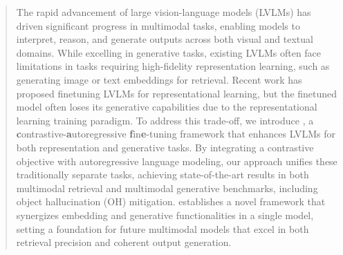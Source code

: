 \begin{abstract}
The rapid advancement of large vision-language models (LVLMs) has driven significant progress in multimodal tasks, enabling models to interpret, reason, and generate outputs across both visual and textual domains. 
%
While excelling in generative tasks, existing LVLMs often face limitations in tasks requiring high-fidelity representation learning, such as generating image or text embeddings for retrieval. 
%
Recent work has proposed finetuning LVLMs for representational learning, but the finetuned model often loses its generative capabilities due to the representational learning training paradigm.
%
To address this trade-off, we introduce \textbf{\algname}, a \textbf{c}ontrastive-\textbf{a}utoregressive \textbf{f}in\textbf{e}-tuning framework that enhances LVLMs for both representation and generative tasks.
%
By integrating a contrastive objective with autoregressive language modeling, our approach unifies these traditionally separate tasks, achieving state-of-the-art results in both multimodal retrieval and multimodal generative benchmarks, including
object hallucination (OH) mitigation. 
%
\algname establishes a novel
framework that synergizes embedding and generative functionalities in a single model, setting a foundation for future multimodal models that excel in both retrieval precision and coherent output generation.
%
\end{abstract}